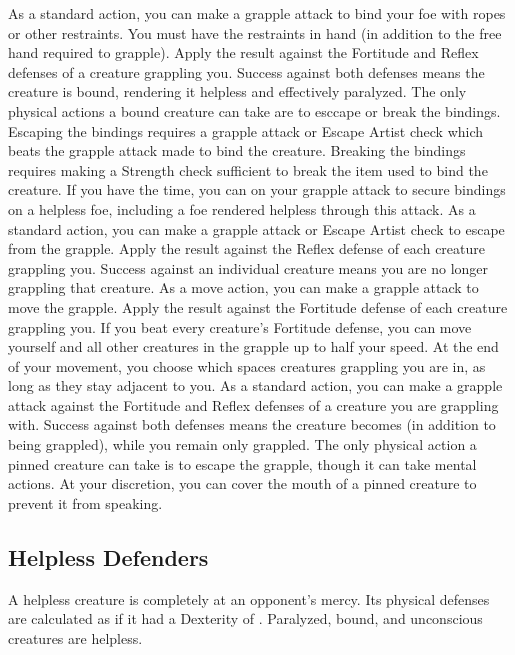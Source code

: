              As a standard action, you can make a grapple attack to bind your foe with ropes or other restraints. You must have the restraints in hand (in addition to the free hand required to grapple). Apply the result against the Fortitude and Reflex defenses of a creature grappling you. Success against both defenses means the creature is bound, rendering it helpless and effectively paralyzed. The only physical actions a bound creature can take are to esccape or break the bindings. Escaping the bindings requires a grapple attack or Escape Artist check which beats the grapple attack made to bind the creature. Breaking the bindings requires making a Strength check sufficient to break the item used to bind the creature. If you have the time, you can  on your grapple attack to secure bindings on a helpless foe, including a foe rendered helpless through this attack.
             As a standard action, you can make a grapple attack or Escape Artist check to escape from the grapple. Apply the result against the Reflex defense of each creature grappling you. Success against an individual creature means you are no longer grappling that creature.
             As a move action, you can make a grapple attack to move the grapple. Apply the result against the Fortitude defense of each creature grappling you. If you beat every creature's Fortitude defense, you can move yourself and all other creatures in the grapple up to half your speed. At the end of your movement, you choose which spaces creatures grappling you are in, as long as they stay adjacent to you.
             As a standard action, you can make a grapple attack against the Fortitude and Reflex defenses of a creature you are grappling with. Success against both defenses means the creature becomes  (in addition to being grappled), while you remain only grappled. The only physical action a pinned creature can take is to escape the grapple, though it can take mental actions. At your discretion, you can cover the mouth of a pinned creature to prevent it from speaking.

    \subsection{Helpless Defenders}
        A helpless creature is completely at an opponent's mercy.
        Its physical defenses are calculated as if it had a Dexterity of .
        Paralyzed, bound, and unconscious creatures are helpless.

